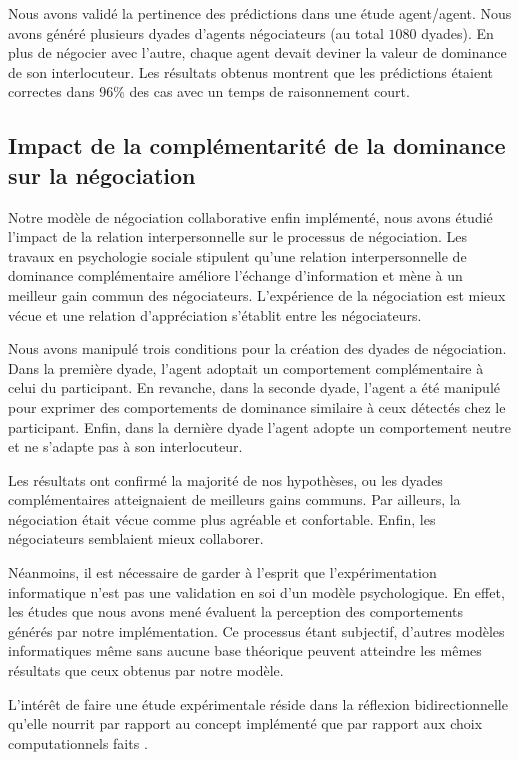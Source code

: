 		Nous avons validé la pertinence des prédictions dans une étude agent/agent. Nous avons généré plusieurs dyades d'agents négociateurs (au total $1080$ dyades). En plus de négocier avec l'autre, chaque agent devait deviner la valeur de dominance de son interlocuteur.
		Les résultats obtenus montrent que les prédictions étaient correctes dans $96\%$ des cas avec un temps de raisonnement court. 
		
		\subsection{Impact de la complémentarité de la dominance sur la négociation}
		
		Notre modèle de négociation collaborative enfin implémenté, nous avons étudié l'impact de la relation interpersonnelle sur le processus de négociation. 
		Les travaux en psychologie sociale stipulent qu’une relation interpersonnelle de dominance complémentaire améliore l’échange 
		d’information et mène à un meilleur gain commun des négociateurs.
		L’expérience de la négociation est mieux vécue et une relation d’appréciation s’établit entre les négociateurs. 
		
		Nous avons manipulé trois conditions pour la création des dyades de négociation. Dans la première dyade, l'agent adoptait un comportement complémentaire à celui du participant. En revanche, dans la seconde dyade, l'agent a été manipulé pour exprimer des comportements de dominance similaire à ceux détectés chez le participant. Enfin, dans la dernière dyade l'agent adopte un comportement neutre et ne s'adapte pas à son interlocuteur.
		
		Les résultats ont confirmé la majorité de nos hypothèses, ou les dyades complémentaires atteignaient de meilleurs gains communs. Par ailleurs,  la négociation était vécue comme plus agréable et confortable. Enfin, les négociateurs semblaient mieux collaborer. 
		
		Néanmoins, il est nécessaire de garder à l’esprit que l’expérimentation informatique n’est pas une validation en soi d’un modèle psychologique. En effet, les études que nous avons mené évaluent la perception des comportements générés par notre implémentation. Ce processus étant subjectif, d'autres modèles informatiques même sans aucune base théorique peuvent atteindre les mêmes résultats que ceux obtenus par notre modèle.
		
		L'intérêt de faire une étude expérimentale réside dans la réflexion bidirectionnelle qu’elle nourrit par rapport au concept implémenté que par rapport aux choix computationnels faits \cite{faur2016approche}.
		
